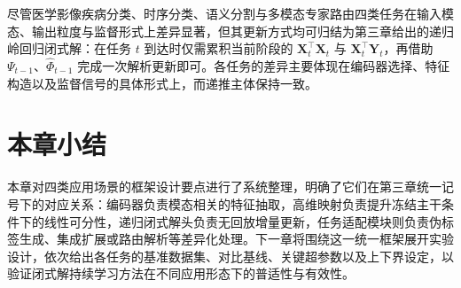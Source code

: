 尽管医学影像疾病分类、时序分类、语义分割与多模态专家路由四类任务在输入模态、输出粒度与监督形式上差异显著，但其更新方式均可归结为第三章给出的递归岭回归闭式解：在任务 $t$ 到达时仅需累积当前阶段的 $\mathbf{X}_t^{\top}\mathbf{X}_t$ 与 $\mathbf{X}_t^{\top}\mathbf{Y}_t$，再借助 $\Psi_{t-1}$、$\widehat{\Phi}_{t-1}$ 完成一次解析更新即可。各任务的差异主要体现在编码器选择、特征构造以及监督信号的具体形式上，而递推主体保持一致。



\section{本章小结}

本章对四类应用场景的框架设计要点进行了系统整理，明确了它们在第三章统一记号下的对应关系：编码器负责模态相关的特征抽取，高维映射负责提升冻结主干条件下的线性可分性，递归闭式解头负责无回放增量更新，任务适配模块则负责伪标签生成、集成扩展或路由解析等差异化处理。下一章将围绕这一统一框架展开实验设计，依次给出各任务的基准数据集、对比基线、关键超参数以及上下界设定，以验证闭式解持续学习方法在不同应用形态下的普适性与有效性。
